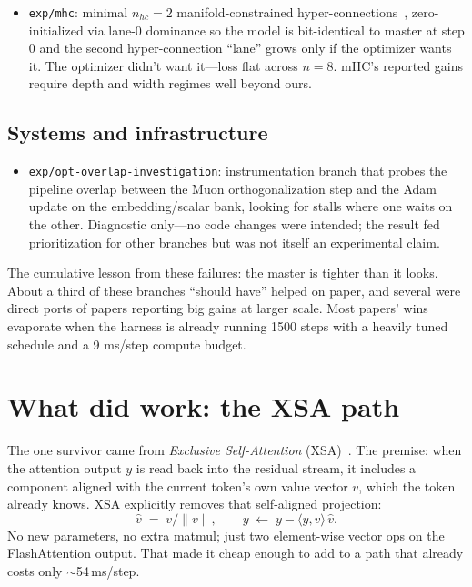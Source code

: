 \documentclass[10pt,letterpaper]{article}
\newcommand{\code}[1]{\texttt{\small #1}}
\begin{document}
\begin{itemize}[leftmargin=1.2em,itemsep=4pt]
  \item \code{exp/mhc}: minimal $n_{hc}=2$ manifold-constrained hyper-connections~\cite{mhc}, zero-initialized via lane-0 dominance so the model is bit-identical to master at step 0 and the second hyper-connection ``lane'' grows only if the optimizer wants it. The optimizer didn't want it---loss flat across $n=8$. mHC's reported gains require depth and width regimes well beyond ours.
\end{itemize}

\subsection{Systems and infrastructure}
\begin{itemize}[leftmargin=1.2em,itemsep=4pt]
  \item \code{exp/opt-overlap-investigation}: instrumentation branch that probes the pipeline overlap between the Muon orthogonalization step and the Adam update on the embedding/scalar bank, looking for stalls where one waits on the other. Diagnostic only---no code changes were intended; the result fed prioritization for other branches but was not itself an experimental claim.
\end{itemize}

The cumulative lesson from these failures: the master is tighter than it looks. About a third of these branches ``should have'' helped on paper, and several were direct ports of papers reporting big gains at larger scale. Most papers' wins evaporate when the harness is already running 1500 steps with a heavily tuned schedule and a 9 ms/step compute budget.

\section{What did work: the XSA path}
\label{sec:xsa}

The one survivor came from \emph{Exclusive Self-Attention} (XSA)~\cite{xsa_zhai}. The premise: when the attention output $y$ is read back into the residual stream, it includes a component aligned with the current token's own value vector $v$, which the token already knows. XSA explicitly removes that self-aligned projection:
\[
  \hat{v} \;=\; v / \lVert v \rVert, \qquad y \;\leftarrow\; y - \langle y, \hat{v}\rangle\, \hat{v}.
\]
No new parameters, no extra matmul; just two element-wise vector ops on the FlashAttention output. That made it cheap enough to add to a path that already costs only $\sim$54\,ms/step.
\end{document}
